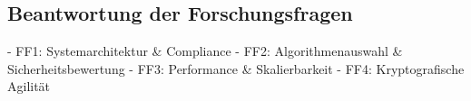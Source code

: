 \subsection{Beantwortung der Forschungsfragen} \label{sec:Beantwortung der Forschungsfragen}

- FF1: Systemarchitektur \& Compliance
- FF2: Algorithmenauswahl \& Sicherheitsbewertung
- FF3: Performance \& Skalierbarkeit
- FF4: Kryptografische Agilität